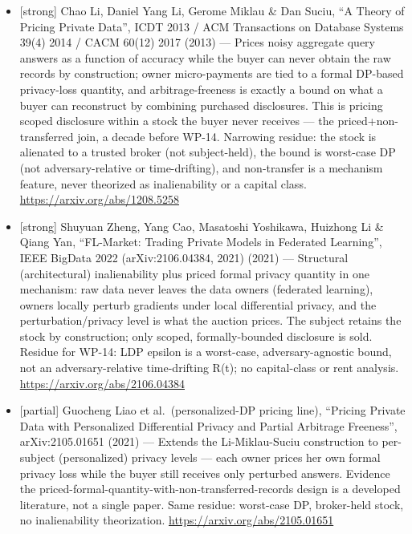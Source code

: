 \documentclass[
  11pt,
]{article}
\providecommand{\tightlist}{%
  \setlength{\itemsep}{0pt}\setlength{\parskip}{0pt}}
\begin{document}
\begin{itemize}
\tightlist
\item
  {[}strong{]} Chao Li, Daniel Yang Li, Gerome Miklau \& Dan Suciu, ``A
  Theory of Pricing Private Data'', ICDT 2013 / ACM Transactions on
  Database Systems 39(4) 2014 / CACM 60(12) 2017 (2013) --- Prices noisy
  aggregate query answers as a function of accuracy while the buyer can
  never obtain the raw records by construction; owner micro-payments are
  tied to a formal DP-based privacy-loss quantity, and
  arbitrage-freeness is exactly a bound on what a buyer can reconstruct
  by combining purchased disclosures. This is pricing scoped disclosure
  within a stock the buyer never receives --- the priced+non-transferred
  join, a decade before WP-14. Narrowing residue: the stock is alienated
  to a trusted broker (not subject-held), the bound is worst-case DP
  (not adversary-relative or time-drifting), and non-transfer is a
  mechanism feature, never theorized as inalienability or a capital
  class. \url{https://arxiv.org/abs/1208.5258}
\item
  {[}strong{]} Shuyuan Zheng, Yang Cao, Masatoshi Yoshikawa, Huizhong Li
  \& Qiang Yan, ``FL-Market: Trading Private Models in Federated
  Learning'', IEEE BigData 2022 (arXiv:2106.04384, 2021) (2021) ---
  Structural (architectural) inalienability plus priced formal privacy
  quantity in one mechanism: raw data never leaves the data owners
  (federated learning), owners locally perturb gradients under local
  differential privacy, and the perturbation/privacy level is what the
  auction prices. The subject retains the stock by construction; only
  scoped, formally-bounded disclosure is sold. Residue for WP-14: LDP
  epsilon is a worst-case, adversary-agnostic bound, not an
  adversary-relative time-drifting R(t); no capital-class or rent
  analysis. \url{https://arxiv.org/abs/2106.04384}
\item
  {[}partial{]} Guocheng Liao et al.~(personalized-DP pricing line),
  ``Pricing Private Data with Personalized Differential Privacy and
  Partial Arbitrage Freeness'', arXiv:2105.01651 (2021) --- Extends the
  Li-Miklau-Suciu construction to per-subject (personalized) privacy
  levels --- each owner prices her own formal privacy loss while the
  buyer still receives only perturbed answers. Evidence the
  priced-formal-quantity-with-non-transferred-records design is a
  developed literature, not a single paper. Same residue: worst-case DP,
  broker-held stock, no inalienability theorization.
  \url{https://arxiv.org/abs/2105.01651}

\end{itemize}
\end{document}
